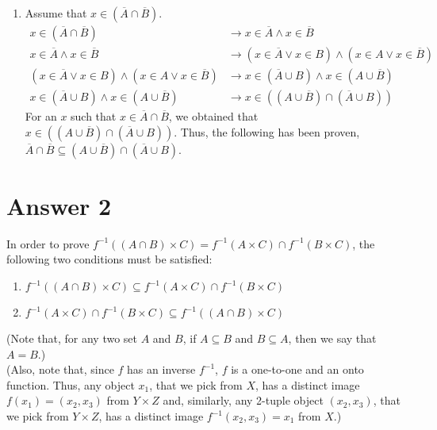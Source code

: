 \documentclass[12pt]{article}
\begin{document}
\begin{enumerate}
    \item Assume that $x \in (\overline{A} \cap \overline{B})$.
        \begin{equation*}
        \begin{split}
        x \in (\overline{A} \cap \overline{B}) & \rightarrow x \in \overline{A} \land x \in \overline{B} 
        \\
        x \in \overline{A} \land x \in \overline{B}  & \rightarrow (x \in \overline{A} \lor x\in B) \land (x \in A \lor x \in \overline{B}) 
        \\
        (x \in \overline{A} \lor x\in B) \land (x \in A \lor x \in \overline{B}) & \rightarrow x \in (\overline{A} \cup B) \land x \in(A \cup \overline{B})
        \\
        x \in (\overline{A} \cup B) \land x \in(A \cup \overline{B}) & \rightarrow  x \in ((A \cup \overline{B}) \cap (\overline{A} \cup B))
        \end{split}
        \end{equation*}
        For an $x$ such that $x  \in \overline{A} \cap \overline{B}$, we obtained that $x \in ((A \cup \overline{B}) \cap (\overline{A} \cup B))$. Thus, the following has been proven, $\overline{A} \cap \overline{B} \subseteq (A \cup \overline{B}) \cap (\overline{A} \cup B)$.
        
 \end{enumerate}



\section*{Answer 2}

In order to prove $f^{-1}((A \cap B) \times C) = f^{-1}(A \times C) \cap f^{-1}(B \times C)$, the following two conditions must be satisfied:
\renewcommand{\theenumi}{\roman{enumi}}
\begin{enumerate}
    \item $f^{-1}((A \cap B) \times C) \subseteq f^{-1}(A \times C) \cap f^{-1}(B \times C)$
    \item $f^{-1}(A \times C) \cap f^{-1}(B \times C) \subseteq f^{-1}((A \cap B) \times C)$
\end{enumerate}
(Note that, for any two set $A$ and $B$, if $A \subseteq B$ and $B \subseteq A$, then we say that $A = B$.)\\
(Also, note that, since $f$ has an inverse $f^{-1}$, $f$ is a one-to-one and an onto function. Thus, any object $x_1$, that we pick from $X$, has a distinct image $f(x_1) = (x_2, x_3)$ from $Y \times Z$ and, similarly, any 2-tuple object $(x_2, x_3)$, that we pick from $Y \times Z$, has a distinct image $f^{-1}(x_2, x_3) = x_1$ from $X$.)
\end{document}
